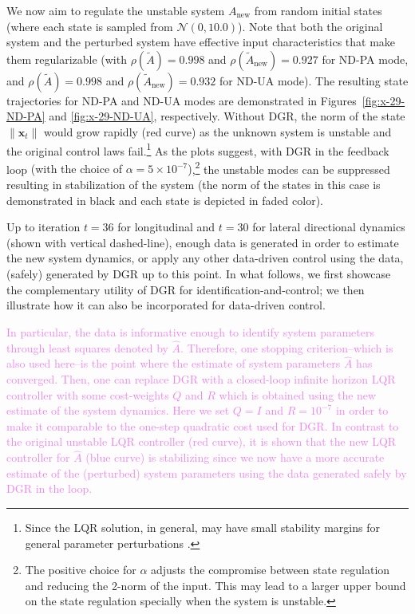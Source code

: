 \documentclass[journal]{IEEEtran}
\theoremstyle{definition}
\theoremstyle{remark}
\newcommand\x{{\bm x}}
\begin{document}
    We now aim to regulate the unstable system $A_{\text{new}}$ from random initial states (where each state is sampled from $\mathcal{N}(0, 10.0)$).
    Note that both the original system and the perturbed system have effective input characteristics that make them  regularizable (with $\rho(\widetilde{A}) = 0.998 $ and $\rho(\widetilde{A}_\text{new}) = 0.927 $ for ND-PA mode, and $\rho(\widetilde{A}) = 0.998 $ and $\rho(\widetilde{A}_{\text{new}}) = 0.932 $ for ND-UA mode).
	The resulting state trajectories for ND-PA and ND-UA modes are demonstrated in Figures~\ref{fig:x-29-ND-PA} and \ref{fig:x-29-ND-UA}, respectively.
	Without \ac{DGR}, the norm of the state $\|\x_t\|$ would grow rapidly (red curve) as the unknown system is unstable and the original control laws fail.\footnote{Since the LQR solution, in general, may have small stability margins for general parameter perturbations \cite{zhou1996robust}.}
	As the plots suggest, with \ac{DGR} in the feedback loop 
	{\color{violet}(with the choice of $\alpha = 5\times 10^{-7}$)},\footnote{The positive choice for $\alpha$ adjusts the compromise between state regulation and reducing the 2-norm of the input. This may lead to a larger upper bound on the state regulation specially when the system is unstable.} the unstable modes can be suppressed resulting in stabilization of the system (the norm of the states in this case is demonstrated in black and each state is depicted in faded color).
	
	Up to iteration $t=36$ for longitudinal and $t=30$ for lateral directional dynamics  (shown with vertical dashed-line), enough data is generated in order to estimate the new system dynamics, or apply any other data-driven control using the data, (safely) generated by \ac{DGR} up to this point.
	{\color{PineGreen} In what follows, we first showcase the complementary utility of DGR for identification-and-control; we then illustrate how it can also 
	be incorporated for data-driven control.
	}
    
    
	\textcolor{violet}{In particular, the data is informative enough to identify system parameters through least squares denoted by $\hat{A}$.
	Therefore, one stopping criterion--which is also used here--is the point where the estimate of system parameters $\hat{A}$ has converged.
	Then, one can replace \ac{DGR} with a closed-loop infinite horizon \ac{LQR} controller with some cost-weights $Q$ and $R$ which is obtained using the new estimate of the system dynamics. Here we set $Q=I$ and $R = 10^{-7}$ in order to make it comparable to the one-step quadratic cost used for \ac{DGR}.
	In contrast to the original unstable \ac{LQR} controller (red curve), it is shown that the new LQR controller for $\hat{A}$ (blue curve) is stabilizing since we now have a more accurate estimate of the (perturbed) system parameters using the data generated safely by \ac{DGR} in the loop.}
	
\end{document}
